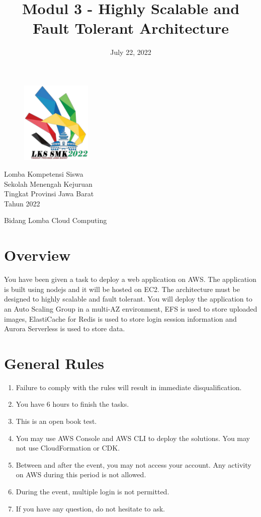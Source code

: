 \documentclass{article}
\title{Modul 3 - Highly Scalable and Fault Tolerant Architecture}
\author{}
\date{July 22, 2022}
\begin{document}
\begin{figure}[h]
\centering
\includegraphics[width=0.3\textwidth]{logo.png}
\end{figure}
\centering
{\huge
Lomba Kompetensi Siswa\\
Sekolah Menengah Kejuruan\\
Tingkat Provinsi Jawa Barat\\
Tahun 2022\\
\vspace{10mm} 
}
\vspace{30mm} 
{\let\newpage\relax\maketitle}
\vspace{30mm} 
{\LARGE Bidang Lomba Cloud Computing}

\thispagestyle{empty}
\newpage
\raggedright
{}

\section{Overview}
You have been given a task to deploy a web application on AWS. The application is built using nodejs and it will be hosted on EC2. The architecture must be designed to highly scalable and fault tolerant. You will deploy the application to an Auto Scaling Group in a multi-AZ environment, EFS is used to store uploaded images, ElastiCache for Redis is used to store login session information and Aurora Serverless is used to store data.

\section{General Rules}
\begin{enumerate}
  \item Failure to comply with the rules will result in immediate disqualification.
  \item You have 6 hours to finish the tasks.
  \item This is an open book test.
  \item You may use AWS Console and AWS CLI to deploy the solutions. You may not use CloudFormation or CDK.
  \item Between and after the event, you may not access your account. Any activity on AWS during this period is not allowed.
  \item During the event, multiple login is not permitted.
  \item If you have any question, do not hesitate to ask.
\end{enumerate}
\end{document}
